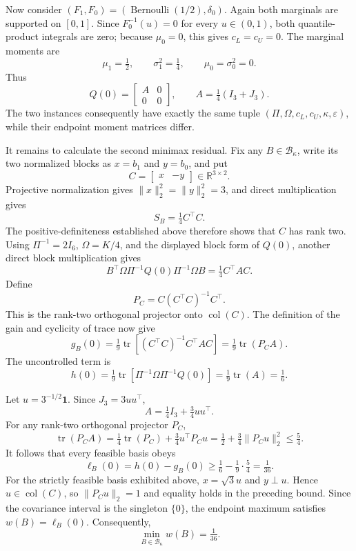 Now consider \((F_1,F_0)=(\operatorname{Bernoulli}(1/2),\delta_0)\).  Again both marginals are supported on \([0,1]\).  Since \(F_0^{-1}(u)=0\) for every \(u\in(0,1)\), both quantile-product integrals are zero; because \(\mu_0=0\), this gives \(c_L=c_U=0\).  The marginal moments are
\[
\mu_1=\tfrac12,
\qquad
\sigma_1^2=\tfrac14,
\qquad
\mu_0=\sigma_0^2=0.
\]
Thus
\[
Q(0)=
\begin{bmatrix}
A&0\\
0&0
\end{bmatrix},
\qquad
A=\tfrac14(I_3+J_3).
\]
The two instances consequently have exactly the same tuple \((\Pi,\Omega,c_L,c_U,\kappa,\varepsilon)\), while their endpoint moment matrices differ.

It remains to calculate the second minimax residual.  Fix any \(B\in\mathcal B_\kappa\), write its two normalized blocks as \(x=b_1\) and \(y=b_0\), and put
\[
C=
\begin{bmatrix}
x&-y
\end{bmatrix}
\in\mathbb R^{3\times2}.
\]
Projective normalization gives \(\lVert x\rVert_2^2=\lVert y\rVert_2^2=3\), and direct multiplication gives
\[
S_B=\tfrac14 C^{\top}C.
\]
The positive-definiteness established above therefore shows that \(C\) has rank two.  Using \(\Pi^{-1}=2I_6\), \(\Omega=K/4\), and the displayed block form of \(Q(0)\), another direct block multiplication gives
\[
B^{\top}\Omega\Pi^{-1}Q(0)\Pi^{-1}\Omega B
=\tfrac14 C^{\top}AC.
\]
Define
\[
P_C=C(C^{\top}C)^{-1}C^{\top}.
\]
This is the rank-two orthogonal projector onto \(\operatorname{col}(C)\).  The definition of the gain and cyclicity of trace now give
\[
g_B(0)
=\tfrac19\operatorname{tr}\!\left[(C^{\top}C)^{-1}C^{\top}AC\right]
=\tfrac19\operatorname{tr}(P_CA).
\]
The uncontrolled term is
\[
h(0)
=\tfrac19\operatorname{tr}\!\left[\Pi^{-1}\Omega\Pi^{-1}Q(0)\right]
=\tfrac19\operatorname{tr}(A)
=\tfrac16.
\]

Let \(u=3^{-1/2}\mathbf 1\).  Since \(J_3=3uu^{\top}\),
\[
A=\tfrac14I_3+\tfrac34uu^{\top}.
\]
For any rank-two orthogonal projector \(P_C\),
\[
\operatorname{tr}(P_CA)
=\tfrac14\operatorname{tr}(P_C)+\tfrac34u^{\top}P_Cu
=\tfrac12+\tfrac34\lVert P_Cu\rVert_2^2
\le\tfrac54.
\]
It follows that every feasible basis obeys
\[
\ell_B(0)=h(0)-g_B(0)
\ge\tfrac16-\tfrac19\cdot\tfrac54
=\tfrac1{36}.
\]
For the strictly feasible basis exhibited above, \(x=\sqrt3u\) and \(y\perp u\).  Hence \(u\in\operatorname{col}(C)\), so \(\lVert P_Cu\rVert_2=1\) and equality holds in the preceding bound.  Since the covariance interval is the singleton \(\{0\}\), the endpoint maximum satisfies \(w(B)=\ell_B(0)\).  Consequently,
\[
\min_{B\in\mathcal B_\kappa}w(B)=\tfrac1{36}.
\]

